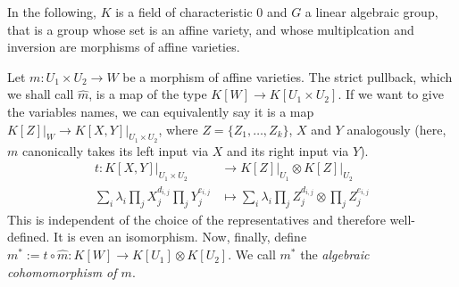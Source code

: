 In the following, $K$ is a field of characteristic $0$ and $G$ a linear algebraic group, that is a group whose set is an affine variety, and whose multiplcation and inversion are morphisms of affine varieties.

\begin{definition}
  Let $m \colon U_1 \times U_2 \longrightarrow W$ be a morphism of affine varieties.
  The strict pullback, which we shall call $\hat{m}$, is a map of the type $K[W] \longrightarrow K[U_1 \times U_2]$.
  If we want to give the variables names, we can equivalently say it is a map $ \left. K[Z] \right|_W \longrightarrow \left. K[X,Y] \right|_{U_1 \times U_2} $, where $ Z = \lbrace Z_1 , \ldots , Z_k \rbrace $, $X$ and $Y$ analogously (here, $ m $ canonically takes its left input via $ X $ and its right input via $ Y $).
  \begin{equation}
    \begin{aligned}
      t \colon \left. K \left\lbrack X , Y \right\rbrack \right|_{U_1 \times U_2} &\longrightarrow \left. K \left\lbrack Z \right\rbrack \right|_{U_1} \otimes \left. K\left\lbrack Z \right\rbrack \right|_{U_2} \\
      \sum_i \lambda_i \prod_j X_{j}^{d_{i,j}} \prod_j Y_{j}^{e_{i,j}} &\longmapsto \sum_i \lambda_i \prod_j Z_{j}^{d_{i,j}} \otimes \prod_j Z_{j}^{e_{i,j}}
    \end{aligned}
  \end{equation}
  This is independent of the choice of the representatives and therefore well-defined.
  It is even an isomorphism.
  Now, finally, define $m^\ast := t \circ \hat{m} : K[W] \longrightarrow K[U_1] \otimes K[U_2]$.
  We call $m^\ast$ the \textit{algebraic cohomomorphism of $m$}.
\end{definition}

